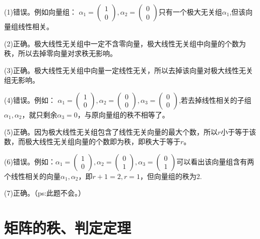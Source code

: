 \documentclass[a4paper]{report}
\begin{document}
\begin{jie}
(1)错误。例如向量组：
$\alpha_1=
\begin{pmatrix}
1\\ 0
\end{pmatrix},\alpha_2=
\begin{pmatrix}
0\\ 0
\end{pmatrix}
$只有一个极大无关组$\alpha_1$,但该向量组线性相关。

(2)正确。极大线性无关组中一定不含零向量，极大线性无关组中向量的个数为秩，所以去掉零向量对求秩无影响。

(3)正确。极大线性无关组中向量一定线性无关，所以去掉该向量对极大线性无关组无影响。

(4)错误。例如：
$\alpha_1=
\begin{pmatrix}
1\\ 0
\end{pmatrix},\alpha_2=
\begin{pmatrix}
0\\ 0
\end{pmatrix},\alpha_3=
\begin{pmatrix}
0\\ 0
\end{pmatrix}
$,若去掉线性相关的子组$\alpha_1,\alpha_2$，就只剩余$\alpha_3=0$，与原向量组的秩不相等了。

(5)正确。因为极大线性无关组包含了线性无关向量的最大个数，所以$r$小于等于该数，而极大线性无关组向量的个数即为秩，即秩大于等于$r$。

(6)错误。例如：$\alpha_1=
\begin{pmatrix}
1\\ 0
\end{pmatrix},\alpha_2=
\begin{pmatrix}
0\\ 1
\end{pmatrix},\alpha_3=
\begin{pmatrix}
0\\ 1
\end{pmatrix}
$可以看出该向量组含有两个线性相关的向量$\alpha_1,\alpha_2$，即$r+1=2,r=1$，但向量组的秩为2.

(7)正确。（\textcolor[rgb]{0.50,1.00,0.00}{ps:此题不会。}）
\end{jie}

\clearpage
\section{矩阵的秩、判定定理}
\end{document}
